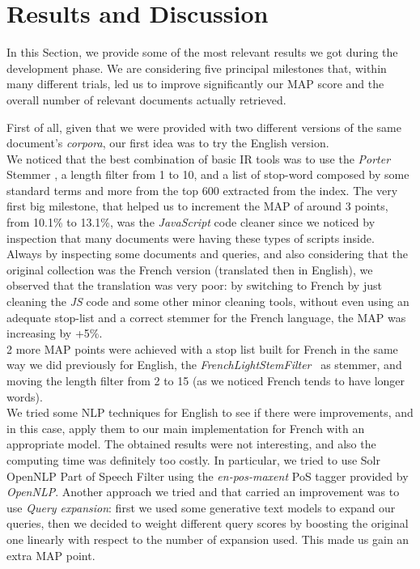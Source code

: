 \pagebreak
\section{Results and Discussion}

\label{sec:results}


In this Section, we provide some of the most relevant results we got during the development phase.
We are considering five principal milestones that, within many different trials, led us to improve significantly our \ac{MAP} score and the overall number of relevant documents actually retrieved.

First of all, given that we were provided with two different versions of the same document's \textit{corpora}, our first idea was to try the English version.\\ 
We noticed that the best combination of basic \ac{IR} tools was to use the \textit{Porter} Stemmer \cite{solrporterstemfilter}, a length filter from 1 to 10, and a list of stop-word composed by some standard terms and more from the top 600 extracted from the index.
The very first big milestone, that helped us to increment the \ac{MAP} of around 3 points, from 10.1\% to 13.1\%, was the \textit{JavaScript} code cleaner since we noticed by inspection that many documents were having these types of scripts inside.\\
Always by inspecting some documents and queries, and also considering that the original collection was the French version (translated then in English), we observed that the translation was very poor: by switching to French
by just cleaning the \textit{JS} code and some other minor cleaning tools, without even using an adequate stop-list and a correct stemmer for the French language, the \ac{MAP} was increasing by +5\%. \\
2 more \ac{MAP} points were achieved with a stop list built for French in the same way we did previously for English, the \textit{FrenchLightStemFilter}~\cite{solrfrenchlightstemfilter} as stemmer, and moving the length filter from 2 to 15 (as we noticed French tends to have longer words). \\
We tried some \ac{NLP} techniques for English to see if there were improvements, and in this case, apply them to our main implementation for French with an appropriate model. The obtained results were not interesting, and also the computing time was definitely too costly. In particular, we tried to use Solr OpenNLP Part of Speech Filter \cite{solropennlpposfilter} using the \textit{en-pos-maxent} \ac{PoS} tagger provided by \textit{OpenNLP}. 
Another approach we tried and that carried an improvement was to use \textit{Query expansion}: first we used some generative text models to expand our queries, then we decided to weight different query scores by boosting the original one linearly with respect to the number
of expansion used. This made us gain an extra \ac{MAP} point.

